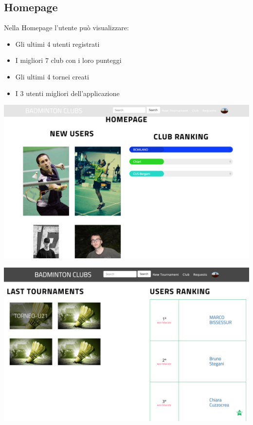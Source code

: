 \documentclass{article}
\begin{document}
\subsection{Homepage}
Nella Homepage l'utente può visualizzare: 
\begin{itemize}
    \item Gli ultimi 4 utenti registrati 
    \item I migliori 7 club con i loro punteggi
    \item Gli ultimi 4 tornei creati
    \item I 3 utenti migliori dell'applicazione
  \end{itemize}
    
  \begin{center}
    \includegraphics[width=16cm]{UX/hometop}
\end{center}
\begin{center}
    \includegraphics[width=16cm]{UX/homebot}
\end{center}
\end{document}
